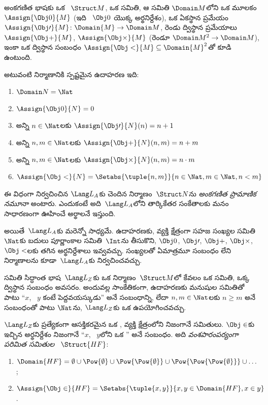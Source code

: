 \documentclass[../../../include/open-logic-section]{subfiles}
\begin{document}
\begin{ex}
అంకగణిత భాషకు ఒక ~$\Struct M$, ఒక సమితి, ఆ సమితి
$\Domain M$లోని ఒక మూలకం $\Assign{\Obj 0}{M}$ (ఇది
~$\Obj 0$ యొక్క అర్థనిర్దేశం), ఒక ఏకస్థాన ప్రమేయం
$\Assign{\Obj \prime}{M} \colon \Domain{M} \to \Domain M$, రెండు
ద్విస్థాన ప్రమేయాలు $\Assign{\Obj +}{M}$, $\Assign{\Obj
  \times}{M}$ (రెండూ $\Domain M^2 \to \Domain M$), ఇంకా ఒక ద్విస్థాన
సంబంధం $\Assign{\Obj <}{M} \subseteq \Domain{M}^2$తో కూడి ఉంటుంది.

అటువంటి నిర్మాణానికి స్పష్టమైన ఉదాహరణ ఇది:
\begin{enumerate}
\item $\Domain N = \Nat$
\item $\Assign{\Obj 0}{N} = 0$
\item అన్ని $n \in \Nat$లకు $\Assign{\Obj \prime}{N}(n) = n + 1$
\item అన్ని $n, m \in \Nat$లకు $\Assign{\Obj +}{N}(n, m) = n + m$
\item అన్ని $n, m \in \Nat$లకు $\Assign{\Obj \times}{N}(n, m) = n\cdot m$
\item $\Assign{\Obj <}{N} = \Setabs{\tuple{n, m}}{n \in \Nat, m \in
  \Nat, n < m}$
\end{enumerate}
ఈ విధంగా నిర్వచించిన $\Lang L_A$కు చెందిన నిర్మాణం~$\Struct N$ను
\emph{అంకగణిత ప్రామాణిక నమూనా} అంటారు. ఎందుకంటే అది~$\Lang L_A$లోని
తార్కికేతర సంకేతాలకు మనం సాధారణంగా ఊహించే అర్థాలనే ఇస్తుంది.

అయితే~$\Lang L_A$కు మరెన్నో  సాధ్యమే. ఉదాహరణకు,
వ్యక్తి క్షేత్రంగా సహజ సంఖ్యల సమితి~$\Nat$కు బదులు పూర్ణాంకాల
సమితి~$\Int$ను తీసుకొని, $\Obj 0$, $\Obj \prime$, $\Obj +$,
$\Obj \times$, $\Obj <$లకు తగిన అర్థనిర్దేశాలు ఇవ్వవచ్చు. సంఖ్యలతో
ఏమాత్రమూ సంబంధం లేని నిర్మాణాలను కూడా~$\Lang L_A$కు నిర్వచించవచ్చు.
\end{ex}

\begin{ex}
సమితి సిద్ధాంత భాష~$\Lang L_Z$కు ఒక నిర్మాణం~$\Struct M$లో కేవలం
ఒక సమితి, ఒక్క ద్విస్థాన సంబంధం అవసరం. అందువల్ల సాంకేతికంగా,
ఉదాహరణకు మనుషుల సమితితో పాటు ``$x$, ~$y$ కంటే పెద్దవయస్కుడు'' అనే
సంబంధాన్ని, లేదా $n, m \in \Nat$లకు $n \ge m$ అనే సంబంధంతో పాటు
$\Nat$ను, $\Lang L_Z$కు ఒక  ఉపయోగించవచ్చు.

$\Lang L_Z$కు ప్రత్యేకంగా ఆసక్తికరమైన ఒక ,
వ్యక్తి క్షేత్రంలోని  నిజంగానే సమితులు. $\Obj \in$కు ఇచ్చిన
అర్థనిర్దేశం నిజంగానే ``$x$, ~$y$లోని ఒక '' అనే సంబంధం.
అది \emph{వంశపారంపర్యంగా పరిమిత సమితుల} ~$\Struct{{HF}}$:
\begin{enumerate}
\item $\Domain{{{HF}}} = \emptyset \cup \Pow{\emptyset} \cup
  \Pow{\Pow{\emptyset}} \cup \Pow{\Pow{\Pow{\emptyset}}} \cup \dots$;
\item $\Assign{\Obj \in}{{{HF}}} = \Setabs{\tuple{x, y}}{x, y \in
  \Domain{{{HF}}}, x \in y}$.
\end{enumerate}
\end{ex}
\end{document}
